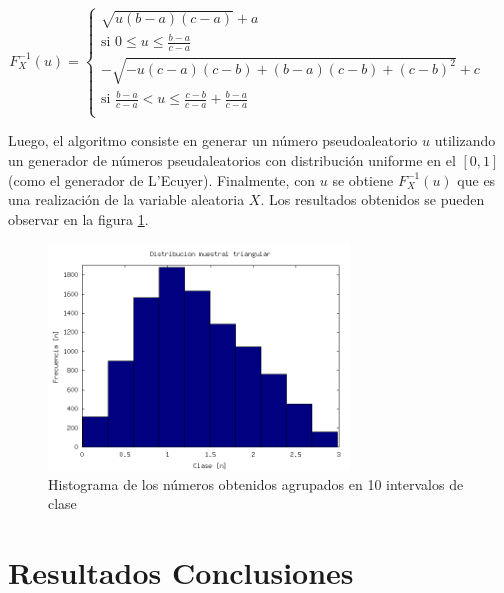 \documentclass{sig-alternate}
\begin{document}
\begin{equation}
\label{eq:inverse}
F^{-1}_{X}(u) =
\begin{cases}
\sqrt{u(b-a)(c-a)}+a \quad & \\
\text{si } 0 \leq u \leq \frac{b-a}{c-a} & \\
-\sqrt{-u(c-a)(c-b)+(b-a)(c-b)+(c-b)^{2}} + c \quad & \\
\text{si } \frac{b-a}{c-a} < u \leq \frac{c-b}{c-a}+\frac{b-a}{c-a} \\
\end{cases}
\end{equation}

Luego, el algoritmo consiste en generar un n\'umero pseudoaleatorio $u$ utilizando
un generador de n\'umeros pseudaleatorios con distribuci\'on uniforme en el $[0,1]$ (como el generador de L'Ecuyer).
Finalmente, con $u$ se obtiene $F^{-1}_{X}(u)$ que es una realizaci\'on de la variable aleatoria $X$.
Los resultados obtenidos se pueden observar en la figura \ref{fig:triangle}.

\begin{figure}[ht]
\label{fig:triangle}
\includegraphics[width=8cm]{histograma_triangular}
\caption{Histograma de los n\'umeros obtenidos agrupados en 10 intervalos de clase}
\end{figure}

\newpage

\section{Resultados Conclusiones}
\label{sec:conclusiones}

\end{document}
